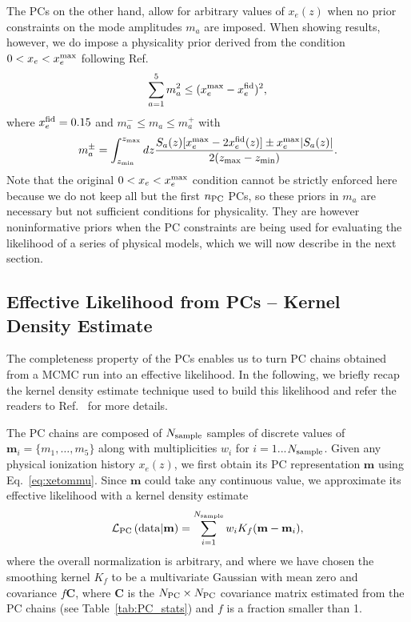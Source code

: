 \documentclass[prd,twocolumn,amsmath,amssymb,floatfix,superscriptaddress,nofootinbib]{revtex4-1}
\newcommand{\beq}{\begin{equation}}
\newcommand{\eeq}{\end{equation}}
\begin{document}
The PCs on the other hand, allow for arbitrary values of $x_e(z)$ when no prior constraints on the mode amplitudes $m_a$ are imposed. When showing results, however, we do impose a physicality prior derived from the condition $0<x_e<x_e^{\rm max}$ following Ref.~\cite{Mortonson:2008rx}
%
\begin{equation}
\sum_{a=1}^5 m_a^2 \le (x_e^{\rm max}-x_e^{\rm fid})^2,
\end{equation}
where $x_e^{\rm fid}=0.15$ and $m_a^{-} \le m_a \le m_a^{+}$ with
\begin{equation}
m_a^{\pm} = \int_{z_{\rm min}}^{z_{\rm max} } dz \frac{S_a(z)[x_e^{\rm max} -2 x_e^{\rm fid}(z)]
\pm x_e^{\rm max} | S_a(z)|}{2(z_{\rm max}-z_{\rm min})}.
\label{eq:individualprior}
\end{equation}
%
Note that the original $0<x_e<x_e^{\rm max}$ condition cannot be strictly enforced here because we do not keep all but the first $n_{\rm PC}$ PCs, so these priors in $m_a$ are necessary but not sufficient conditions for physicality. They are however noninformative priors when the PC constraints are being used for evaluating the likelihood of a series of physical models, which we will now describe in the next section.


\subsection{Effective Likelihood from PCs -- Kernel Density Estimate}
\label{sec:KDE}

The completeness property of the PCs enables us to turn PC chains obtained from a MCMC run into an effective likelihood. In the following, we briefly recap the kernel density estimate technique used to build this likelihood and refer the readers to Ref.~\cite{Heinrich:2016ojb} for more details.

The PC chains are composed of $N_{\rm sample}$ samples of discrete values of $\mathbf{m}_i = \{m_1, \ldots, m_5\}$ along with multiplicities $w_i$ for $i = 1$...$N_{\rm sample}$. Given any physical ionization history $x_e(z)$, we first obtain its PC representation $\mathbf{m}$ using Eq.~\ref{eq:xetommu}. Since $\mathbf{m}$ could take any continuous value, we approximate its effective likelihood with a kernel density estimate
\beq
{\cal L}_{\rm PC}\left({\rm data}|\mathbf{m} \right)  = \sum_{i = 1}^{N_{\rm sample}} w_i K_f(\mathbf{m}-\mathbf{m}_i),
\eeq
where the overall normalization is arbitrary, and where we have chosen the smoothing kernel $K_f$ to be a  multivariate Gaussian with mean zero and covariance $f\mathbf{C}$, where $\mathbf{C}$ is the $N_{\rm PC} \times N_{\rm PC}$ covariance matrix estimated from the PC chains (see Table~\ref{tab:PC_stats}) and $f$ is a fraction smaller than 1.
\end{document}
